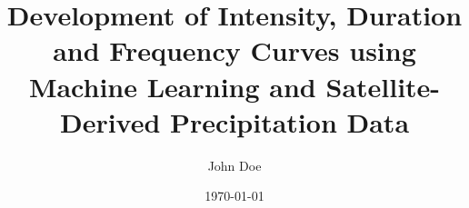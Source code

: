 \documentclass[
  12pt,
  a4paper,
  twocolumn,
]{article}
\author{John Doe}
\title{Development of Intensity, Duration and Frequency Curves using Machine Learning and Satellite-Derived Precipitation Data}
\date{\today}
\begin{document}
\onecolumn
\maketitle

\twocolumn





\onecolumn

\end{document}
